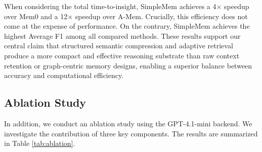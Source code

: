 \documentclass{article}
\newcommand{\ours}{SimpleMem}
\theoremstyle{plain}
\theoremstyle{definition}
\theoremstyle{remark}
\begin{document}
When considering the total time-to-insight, \ours{} achieves a 4$\times$ speedup over Mem0 and a 12$\times$ speedup over A-Mem. Crucially, this efficiency does not come at the expense of performance. On the contrary, \ours{} achieves the highest Average F1 among all compared methods. These results support our central claim that structured semantic compression and adaptive retrieval produce a more compact and effective reasoning substrate than raw context retention or graph-centric memory designs, enabling a superior balance between accuracy and computational efficiency.

\begin{table}[h]
\centering
\vspace{-0.5em}
\caption{Comparison of construction time, retrieval time, total experiment time, and average F1 score across different memory systems (tested on LoCoMo-10 with GPT-4.1-mini; time values are reported as per-sample averages on LoCoMo-10).}
\label{tab:mem_times_acc}
\vspace{-1.5em}
\end{table}


\subsection{Ablation Study}
\label{sec:ablation}
In addition, we conduct an ablation study using the GPT-4.1-mini backend. We investigate the contribution of three key components. The results are summarized in Table \ref{tab:ablation}.
\end{document}
